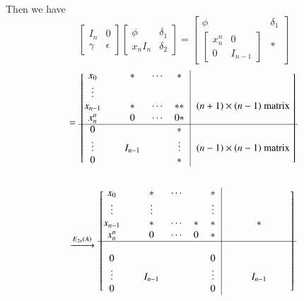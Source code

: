 \begin{PRFF2}
Then we have 
$$
\begin{bmatrix}
I_n & 0\\
\gamma & \epsilon
\end{bmatrix} \begin{bmatrix}
\phi &\delta_1\\
x_nI_n & \delta_2
\end{bmatrix} =\begin{bmatrix}
\phi & \delta_1\\
\begin{bmatrix}
x^{n}_n & 0\\
0 & I_{n-1}
\end{bmatrix} & \ast
\end{bmatrix}
$$
\[
=
  \begin{blockarray}{ccccc|cc}
    \begin{block}{[ccccc|cc]}
      x_0 & &\ast & \cdots & \ast &  \\
      \vdots & & & & & \\
      x_{n-1}& &\ast & \cdots  &\ast\ast &  (n+1)\times (n-1) \text{
        matrix }\\
      x^{n}_n& &0 & \cdots &0\ast  & \\
      \cline{1-6}%
      0 &  & & &\ast & \\
      \vdots & & I_{n-1} & &\vdots&  (n-1)\times (n-1) \text{ matrix }\\
      0 &  & & &\ast &\\
      \end{block}
  \end{blockarray}
\]

\[
\xrightarrow{E_{2n}(A)}
  \begin{blockarray}{cccccc|ccccc}
    \begin{block}{[cccccc|ccccc]}
      x_0 & &\ast & \cdots & &\ast & & & & &  \\
      \vdots &&\vdots & & & \vdots & & & & & \\
      x_{n-1}& &\ast & \cdots  &\ast &\ast &  & &\ast &&\\
      x^{n}_n& &0 & \cdots &0&\ast  & & & & &\\
      \cline{1-11}%
      & & & & & & & & & & & &\\
      0 &  & & & &0 & & & & &\\
      \vdots & & I_{n-1} & & &\vdots& & & I_{n-1} &\\
      0 & & & & &0& & & & &\\
      \end{block}
  \end{blockarray}
\]


\end{PRFF2}
